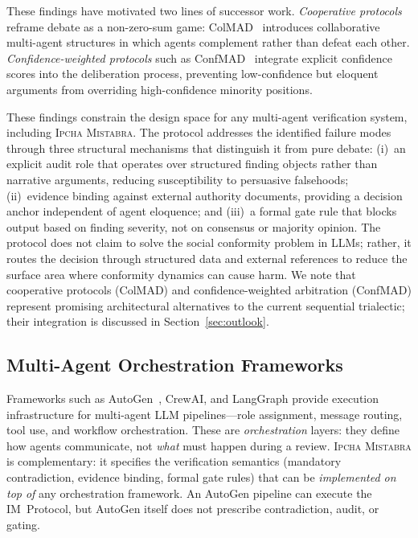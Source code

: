 \documentclass[11pt,a4paper]{article}
\newcommand{\methodname}{\textsc{Ipcha Mistabra}}
\begin{document}
These findings have motivated two lines of successor work.
\emph{Cooperative protocols} reframe debate as a non-zero-sum game: ColMAD~\cite{colmad2025} introduces collaborative multi-agent structures in which agents complement rather than defeat each other.
\emph{Confidence-weighted protocols} such as ConfMAD~\cite{confmad2025} integrate explicit confidence scores into the deliberation process, preventing low-confidence but eloquent arguments from overriding high-confidence minority positions.

These findings constrain the design space for any multi-agent verification system, including \methodname{}.
The protocol addresses the identified failure modes through three structural mechanisms that distinguish it from pure debate:
(i)~an explicit audit role that operates over structured finding objects rather than narrative arguments, reducing susceptibility to persuasive falsehoods;
(ii)~evidence binding against external authority documents, providing a decision anchor independent of agent eloquence; and
(iii)~a formal gate rule that blocks output based on finding severity, not on consensus or majority opinion.
The protocol does not claim to solve the social conformity problem in LLMs; rather, it routes the decision through structured data and external references to reduce the surface area where conformity dynamics can cause harm.
We note that cooperative protocols (ColMAD) and confidence-weighted arbitration (ConfMAD) represent promising architectural alternatives to the current sequential trialectic; their integration is discussed in Section~\ref{sec:outlook}.

\subsection{Multi-Agent Orchestration Frameworks}
Frameworks such as AutoGen~\cite{autogen2023}, CrewAI, and LangGraph provide execution infrastructure for multi-agent LLM pipelines---role assignment, message routing, tool use, and workflow orchestration.
These are \emph{orchestration} layers: they define how agents communicate, not \emph{what} must happen during a review.
\methodname{} is complementary: it specifies the verification semantics (mandatory contradiction, evidence binding, formal gate rules) that can be \emph{implemented on top of} any orchestration framework.
An AutoGen pipeline can execute the IM~Protocol, but AutoGen itself does not prescribe contradiction, audit, or gating.
\end{document}
